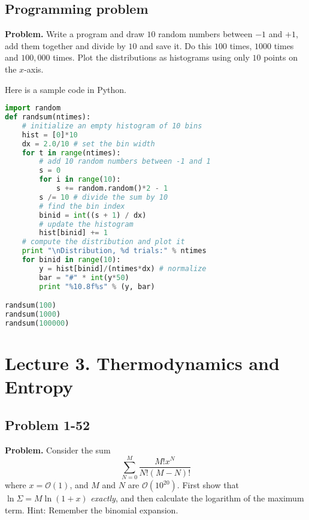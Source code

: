 \documentclass[twocolumn, 10pt]{article}
\numberwithin{equation}{section}
\newenvironment{problem}
{\par\medskip \color{problue}
  \textbf{Problem. }\ignorespaces}
{\medskip}
\newenvironment{solution}[1][\empty]
{\par\medskip\sffamily
  \textbf{\ifx\empty#1{Solution.}\relax\else{#1}\fi} \ignorespaces}
{\medskip}
\begin{document}
\subsection{Programming problem}

\begin{problem}
Write a program and draw $10$ random numbers between $-1$ and $+1$,
add them together and divide by $10$ and save it.
Do this $100$ times, $1000$ times and $100,000$ times.
Plot the distributions as histograms using only $10$ points on the $x$-axis.
\end{problem}

\begin{solution}
Here is a sample code in Python.
\begin{lstlisting}[language=Python]
import random
def randsum(ntimes):
    # initialize an empty histogram of 10 bins
    hist = [0]*10
    dx = 2.0/10 # set the bin width
    for t in range(ntimes):
        # add 10 random numbers between -1 and 1
        s = 0
        for i in range(10):
            s += random.random()*2 - 1
        s /= 10 # divide the sum by 10
        # find the bin index
        binid = int((s + 1) / dx)
        # update the histogram
        hist[binid] += 1
    # compute the distribution and plot it
    print "\nDistribution, %d trials:" % ntimes
    for binid in range(10):
        y = hist[binid]/(ntimes*dx) # normalize
        bar = "#" * int(y*50)
        print "%10.8f%s" % (y, bar)

randsum(100)
randsum(1000)
randsum(100000)
\end{lstlisting}
\end{solution}




\section{Lecture 3. Thermodynamics and Entropy}

\subsection{Problem 1-52}

\begin{problem}
  Consider the sum
  $$
  \sum_{N=0}^M \frac{ M! x^N } { N! (M-N)! }
  $$
  where $x = \mathcal O(1)$,
  and $M$ and $N$ are $\mathcal O(10^{20})$.
  First show that
  $\ln\Sigma = M \ln(1+x)$
  \emph{exactly}, and then calculate
  the logarithm of the maximum term.
  Hint: Remember the binomial expansion.
\end{problem}
\end{document}
